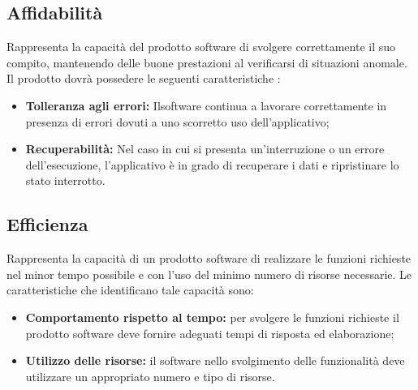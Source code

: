 \subsection{Affidabilità}
Rappresenta la capacità del prodotto software di svolgere correttamente il suo compito, mantenendo delle buone prestazioni al verificarsi di situazioni anomale. Il prodotto dovrà possedere le seguenti caratteristiche :
\begin{itemize}
	\item \textbf{Tolleranza agli errori:} Ilsoftware continua a lavorare correttamente in presenza di errori dovuti a uno scorretto uso dell'applicativo;
	\item \textbf{Recuperabilità:} Nel caso in cui si presenta un'interruzione  o un errore dell'esecuzione, l'applicativo è in grado di recuperare i dati e ripristinare lo stato interrotto.
\end{itemize}

\subsection{Efficienza}
Rappresenta  la capacità di un prodotto software di realizzare le funzioni richieste nel minor tempo possibile e con l'uso del minimo numero di risorse necessarie. 
Le caratteristiche che identificano tale capacità sono:
\begin{itemize}
	\item \textbf{Comportamento rispetto al tempo:} per svolgere le  funzioni richieste il prodotto software deve fornire adeguati tempi di risposta ed elaborazione;
	\item \textbf{Utilizzo delle risorse:} il software nello svolgimento delle funzionalità deve utilizzare un appropriato numero e tipo di risorse.
\end{itemize}

